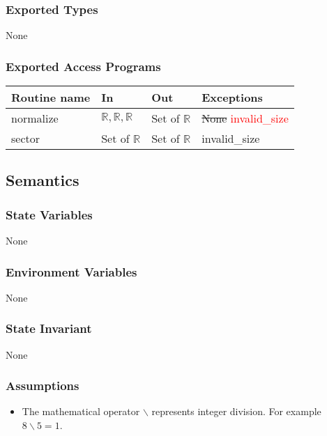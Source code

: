 \documentclass[12pt]{article}
\begin{document}
\subsubsection* {Exported Types}

None

\subsubsection* {Exported Access Programs}

\begin{tabular}{| l | l | l | l |}
\hline
\textbf{Routine name} & \textbf{In} & \textbf{Out} & \textbf{Exceptions}\\
\hline
normalize &$\mathbb{R}, \mathbb{R}, \mathbb{R}$ & Set of $\mathbb{R}$ & \sout{None} \textcolor{red}{ invalid\_size}\\
\hline
sector & Set of $\mathbb{R}$ & Set of $\mathbb{R}$ & invalid\_size\\
\hline
\end{tabular}

\subsection* {Semantics}

\subsubsection* {State Variables}

None

\subsubsection* {Environment Variables}

None

\subsubsection* {State Invariant}

None

\subsubsection* {Assumptions}

\begin{itemize}
\item The mathematical operator $\backslash$ represents integer division. For example $ 8 \backslash 5 = 1$.
\end{itemize}
\end{document}
